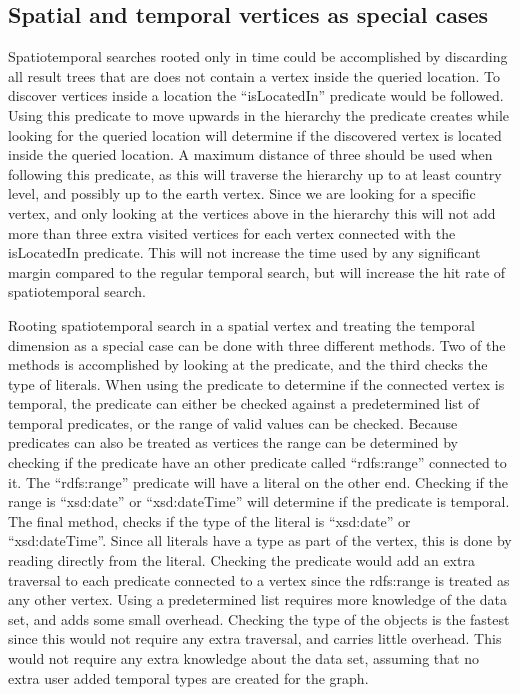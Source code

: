 \subsection{Spatial and temporal vertices as special cases}
Spatiotemporal searches rooted only in time could be accomplished by discarding all result trees that are does not contain a vertex inside the queried location. To discover vertices inside a location the ``isLocatedIn'' predicate would be followed. Using this predicate to move upwards in the hierarchy the predicate creates while looking for the queried location will determine if the discovered vertex is located inside the queried location. A maximum distance of three should be used when following this predicate, as this will traverse the hierarchy up to at least country level, and possibly up to the earth vertex. Since we are looking for a specific vertex, and only looking at the vertices above in the hierarchy this will not add more than three extra visited vertices for each vertex connected with the isLocatedIn predicate. This will not increase the time used by any significant margin compared to the regular temporal search, but will increase the hit rate of spatiotemporal search.

Rooting spatiotemporal search in a spatial vertex and treating the temporal dimension as a special case can be done with three different methods. Two of the methods is accomplished by looking at the predicate, and the third checks the type of literals. When using the predicate to determine if the connected vertex is temporal, the predicate can either be checked against a predetermined list of temporal predicates, or the range of valid values can be checked. Because predicates can also be treated as vertices the range can be determined by checking if the predicate have an other predicate called ``rdfs:range'' connected to it. The ``rdfs:range'' predicate will have a literal on the other end. Checking if the range is ``xsd:date'' or ``xsd:dateTime'' will determine if the predicate is temporal. The final method, checks if the type of the literal is ``xsd:date'' or ``xsd:dateTime''. Since all literals have a type as part of the vertex, this is done by reading directly from the literal. Checking the predicate would add an extra traversal to each predicate connected to a vertex since the rdfs:range is treated as any other vertex. Using a predetermined list requires more knowledge of the data set, and adds some small overhead. Checking the type of the objects is the fastest since this would not require any extra traversal, and carries little overhead. This would not require any extra knowledge about the data set, assuming that no extra user added temporal types are created for the graph.

